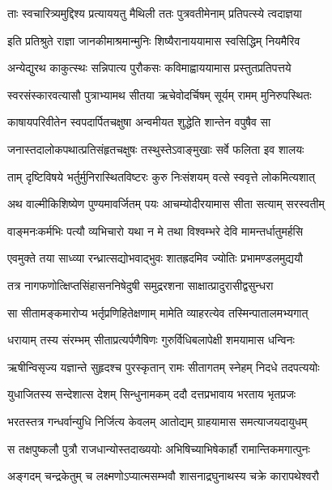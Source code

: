 \twolineshloka
{ताः स्वचारित्र्यमुद्दिश्य प्रत्याययतु मैथिली}
{ततः पुत्रवतीमेनाम् प्रतिपत्स्ये त्वदाज्ञया} %

\twolineshloka
{इति प्रतिश्रुते राज्ञा जानकीमाश्रमान्मुनिः}
{शिष्यैरानाययामास स्वसिद्धिम् नियमैरिव} %

\twolineshloka
{अन्येद्युरथ काकुत्स्थः सन्निपात्य पुरौकसः}
{कविमाह्वाययामास प्रस्तुतप्रतिपत्तये} %

\twolineshloka
{स्वरसंस्कारवत्यासौ पुत्राभ्यामथ सीतया}
{ऋचेवोदर्चिषम् सूर्यम् रामम् मुनिरुपस्थितः} %

\twolineshloka
{काषायपरिवीतेन स्वपदार्पितचक्षुषा}
{अन्वमीयत शुद्धेति शान्तेन वपुषैव सा} %

\twolineshloka
{जनास्तदालोकपथात्प्रतिसंहृतचक्षुषः}
{तस्थुस्तेऽवाङ्मुखाः सर्वे फलिता इव शालयः} %

\twolineshloka
{ताम् दृष्टिविषये भर्तुर्मुनिरास्थितविष्टरः}
{कुरु निःसंशयम् वत्से स्ववृत्ते लोकमित्यशात्} %

\twolineshloka
{अथ वाल्मीकिशिष्येण पुण्यमावर्जितम् पयः}
{आचम्योदीरयामास सीता सत्याम् सरस्वतीम्} %

\twolineshloka
{वाङ्मनःकर्मभिः पत्यौ व्यभिचारो यथा न मे}
{तथा विश्वम्भरे देवि मामन्तर्धातुमर्हसि} %

\twolineshloka
{एवमुक्ते तया साध्व्या रन्ध्रात्सद्योभवाद्भुवः}
{शातह्रदमिव ज्योतिः प्रभामण्डलमुद्ययौ} %

\twolineshloka
{तत्र नागफणोत्क्षिप्तसिंहासननिषेदुषी}
{समुद्ररशना साक्षात्प्रादुरासीद्वसुन्धरा} %

\twolineshloka
{सा सीतामङ्कमारोप्य भर्तृप्रणिहितेक्षणाम्}
{मामेति व्याहरत्येव तस्मिन्पातालमभ्यगात्} %

\twolineshloka
{धरायाम् तस्य संरम्भम् सीताप्रत्यर्पणैषिणः}
{गुरुर्विधिबलापेक्षी शमयामास धन्विनः} %

\twolineshloka
{ऋषीन्विसृज्य यज्ञान्ते सुहृदश्च पुरस्कृतान्}
{रामः सीतागतम् स्नेहम् निदधे तदपत्ययोः} %

\twolineshloka
{युधाजितस्य सन्देशात्स देशम् सिन्धुनामकम्}
{ददौ दत्तप्रभावाय भरताय भृतप्रजः} %

\twolineshloka
{भरतस्तत्र गन्धर्वान्युधि निर्जित्य केवलम्}
{आतोद्यम् ग्राहयामास समत्याजयदायुधम्} %

\twolineshloka
{स तक्षपुष्कलौ पुत्रौ राजधान्योस्तदाख्ययोः}
{अभिषिच्याभिषेकार्हौ रामान्तिकमगात्पुनः} %

\twolineshloka
{अङ्गदम् चन्द्रकेतुम् च लक्ष्मणोऽप्यात्मसम्भवौ}
{शासनाद्रघुनाथस्य चक्रे कारापथेश्वरौ} %

